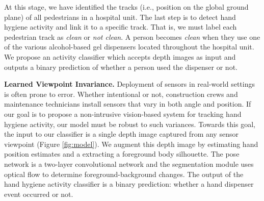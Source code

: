 \documentclass[twoside,11pt]{article}
\begin{document}
At this stage, we have identified the tracks (i.e., position on the global ground plane) of all pedestrians in a hospital unit.
The last step is to detect hand hygiene activity and link it to a specific track. That is, we must label each pedestrian track as \textit{clean} or \textit{not clean}.
A person becomes \textit{clean} when they use one of the various alcohol-based gel dispensers located throughout the hospital unit.
We propose an activity classifier which accepts depth images as input and outputs a binary prediction of whether a person used the dispenser or not. 

\textbf{Learned Viewpoint Invariance.}
Deployment of sensors in real-world settings is often prone to error.
Whether intentional or not, construction crews and maintenance technicians install sensors that vary in both angle and position.
If our goal is to propose a non-intrusive vision-based system for tracking hand hygiene activity, our model must be robust to such variances.
Towards this goal, the input to our classifier is a single depth image captured from any sensor viewpoint (Figure \ref{fig:model}).
We augment this depth image by estimating hand position estimates and a extracting a foreground body silhouette.
The pose network is a two-layer convolutional network and the segmentation module uses optical flow to determine foreground-background changes.
The output of the hand hygiene activity classifier is a binary prediction: whether a hand dispenser event occurred or not.
\end{document}
